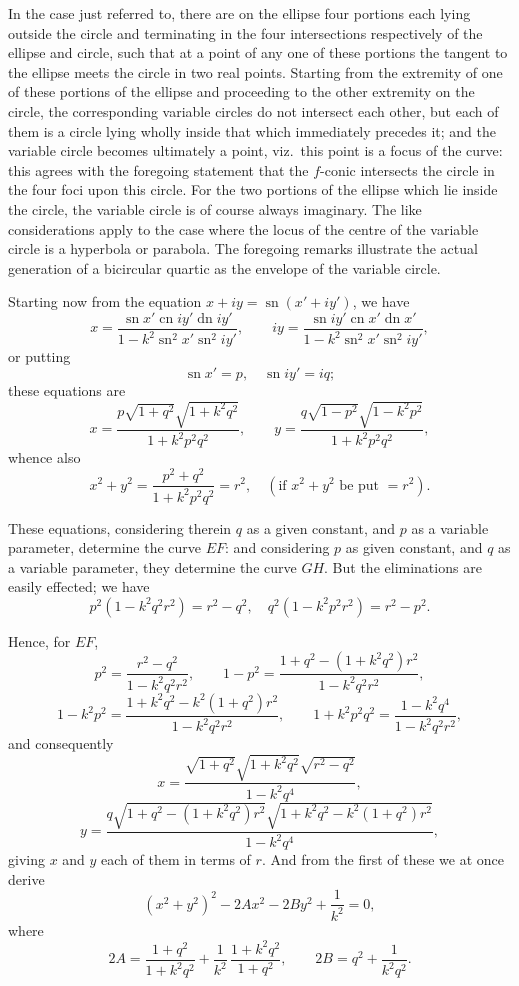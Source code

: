 \documentclass[11pt,a4paper]{article}
\providecommand{\sn}{\operatorname{sn}}
\providecommand{\cn}{\operatorname{cn}}
\providecommand{\dn}{\operatorname{dn}}
\begin{document}
\smallskip
In the case just referred to, there are on the ellipse four portions each lying outside the circle and terminating in the four intersections respectively of the ellipse and circle, such that at a point of any one of these portions the tangent to the ellipse meets the circle in two real points. Starting from the extremity of one of these portions of the ellipse and proceeding to the other extremity on the circle, the corresponding variable circles do not intersect each other, but each of them is a circle lying wholly inside that which immediately precedes it; and the variable circle becomes ultimately a point, viz.\ this point is a focus of the curve: this agrees with the foregoing statement that the $f$-conic intersects the circle in the four foci upon this circle. For the two portions of the ellipse which lie inside the circle, the variable circle is of course always imaginary. The like considerations apply to the case where the locus of the centre of the variable circle is a hyperbola or parabola. The foregoing remarks illustrate the actual generation of a bicircular quartic as the envelope of the variable circle.

\smallskip
Starting now from the equation $x + iy = \sn(x' + iy')$, we have
\[
x = \frac{\sn x' \cn iy' \dn iy'}{1 - k^2 \sn^2 x' \sn^2 iy'}, \qquad iy = \frac{\sn iy' \cn x' \dn x'}{1 - k^2 \sn^2 x' \sn^2 iy'},
\]
or putting
\[
\sn x' = p, \quad \sn iy' = iq;
\]
these equations are
\[
x = \frac{p\sqrt{1 + q^2}\sqrt{1 + k^2 q^2}}{1 + k^2 p^2 q^2}, \qquad y = \frac{q\sqrt{1 - p^2}\sqrt{1 - k^2 p^2}}{1 + k^2 p^2 q^2},
\]
whence also
\[
x^2 + y^2 = \frac{p^2 + q^2}{1 + k^2 p^2 q^2} = r^2, \quad (\text{if } x^2 + y^2 \text{ be put } = r^2).
\]

These equations, considering therein $q$ as a given constant, and $p$ as a variable parameter, determine the curve $EF$: and considering $p$ as given constant, and $q$ as a variable parameter, they determine the curve $GH$. But the eliminations are easily effected; we have
\[
p^2(1 - k^2 q^2 r^2) = r^2 - q^2, \quad q^2(1 - k^2 p^2 r^2) = r^2 - p^2.
\]

\newpage

Hence, for $EF$,
\[
p^2 = \frac{r^2 - q^2}{1 - k^2 q^2 r^2}, \qquad 1 - p^2 = \frac{1 + q^2 - (1 + k^2 q^2)r^2}{1 - k^2 q^2 r^2},
\]
\[
1 - k^2 p^2 = \frac{1 + k^2 q^2 - k^2(1 + q^2)r^2}{1 - k^2 q^2 r^2}, \qquad 1 + k^2 p^2 q^2 = \frac{1 - k^2 q^4}{1 - k^2 q^2 r^2},
\]
and consequently
\[
x = \frac{\sqrt{1 + q^2}\sqrt{1 + k^2 q^2}\sqrt{r^2 - q^2}}{1 - k^2 q^4},
\]
\[
y = \frac{q\sqrt{1 + q^2 - (1 + k^2 q^2)r^2}\sqrt{1 + k^2 q^2 - k^2(1 + q^2)r^2}}{1 - k^2 q^4},
\]
giving $x$ and $y$ each of them in terms of $r$. And from the first of these we at once derive
\[
(x^2 + y^2)^2 - 2Ax^2 - 2By^2 + \frac{1}{k^2} = 0,
\]
where
\[
2A = \frac{1 + q^2}{1 + k^2 q^2} + \frac{1}{k^2}\,\frac{1 + k^2 q^2}{1 + q^2}, \qquad 2B = q^2 + \frac{1}{k^2 q^2}.
\]
\end{document}
